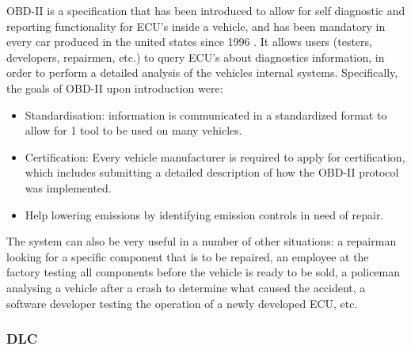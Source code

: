 OBD-II is a specification that has been introduced to allow for self diagnostic and reporting functionality for ECU's inside a vehicle, and has been mandatory in every car produced in the united states since 1996 \cite{wiki:OBD}. It allows users (testers, developers, repairmen, etc.) to query ECU's about diagnostics information, in order to perform a detailed analysis of the vehicles internal systems. Specifically, the goals of OBD-II upon introduction were: 
\begin{itemize}
	\item Standardisation: information is communicated in a standardized format to allow for 1 tool to be used on many vehicles.
	\item Certification: Every vehicle manufacturer is required to apply for certification, which includes submitting a detailed description of how the OBD-II protocol was implemented.
	\item Help lowering emissions by identifying emission controls in need of repair.
\end{itemize} 
The system can also be very useful in a number of other situations: a repairman looking for a specific component that is to be repaired, an employee at the factory testing all components before the vehicle is ready to be sold, a policeman analysing a vehicle after a crash to determine what caused the accident, a software developer testing the operation of a newly developed ECU, etc. 

\subsubsection{DLC}
\label{subsec:obd:dlc}

